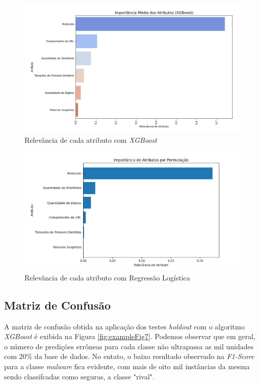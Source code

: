 \documentclass[a4paper, 12pt]{article}
\begin{document}
\begin{figure}[H]
    \centering
    \includegraphics[width=1\textwidth]{Images/Figure_4.png}
    \caption{Relevância de cada atributo com \emph{XGBoost}}
    \label{fig:exampleFig5}
\end{figure}

\begin{figure}[H]
    \centering
    \includegraphics[width=1.1\textwidth]{Images/Figure_5.png}
    \caption{Relevância de cada atributo com Regressão Logística}
    \label{fig:exampleFig6}
\end{figure}

\subsection{Matriz de Confusão}

A matriz de confusão obtida na aplicação dos testes \emph{holdout} com o algoritmo \emph{XGBoost} é exibida na Figura \ref{fig:exampleFig7}. Podemos observar que em geral, o número de predições errôneas para cada classe não ultrapassa as mil unidades com 20\% da base de dados. No entato, o baixo resultado observado na \emph{F1-Score} para a classe \emph{malware} fica evidente, com mais de oito mil instâncias da mesma sendo classifcadas como seguras, a classe "rival". 
\end{document}

